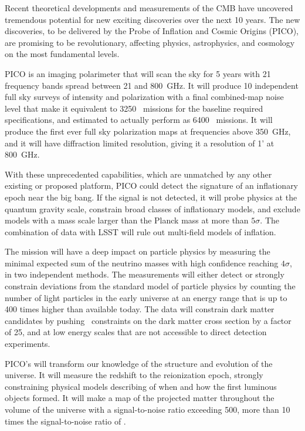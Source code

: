\documentclass[PICOReport.tex]{subfiles}
\begin{document}
Recent theoretical developments and measurements of the \ac{CMB} have uncovered tremendous potential for new exciting discoveries over the next 10 years. The new discoveries, to be delivered by the Probe of Inflation and Cosmic Origins (PICO), are promising to be revolutionary, affecting physics, astrophysics, and cosmology on the most fundamental levels. 

PICO is an imaging polarimeter that will scan the sky for 5 years with 21 frequency bands spread between 21 and 800~GHz. It will produce 10 independent full sky surveys of intensity and polarization with a final combined-map noise level that make it equivalent to 3250 \planck\ missions for the baseline required specifications, and estimated to actually perform as 6400 \planck\ missions. It will produce the first ever full sky polarization maps at frequencies above 350~GHz, and it will have diffraction limited resolution, giving it a resolution of 1' at 800~GHz. 

With these unprecedented capabilities, which are unmatched by any other existing or proposed platform, PICO could detect the signature of an inflationary epoch near the big bang. If the signal is not detected, it will probe physics at the quantum gravity scale, constrain broad classes of inflationary models, and exclude models with a mass scale larger than the Planck mass at more than $5\sigma$. The combination of data with LSST will rule out multi-field models of inflation. 

The mission will have a deep impact on particle physics by measuring the minimal expected sum of the neutrino masses with high confidence reaching $4\sigma$, in two independent methods. The measurements will either detect or strongly constrain deviations from the standard model of particle physics by counting the number of light particles in the early universe at an energy range that is up to 400 times higher than available today. The data will constrain dark matter candidates by pushing \planck\ constraints on the dark matter cross section by a factor of 25, and at low energy scales that are not accessible to direct detection experiments. 

PICO's will transform our knowledge of the structure and evolution of the universe. It will measure the redshift to the reionization epoch, strongly constraining physical models describing of when and how the first luminous objects formed. It will make a map of the projected matter throughout the volume of the universe with a signal-to-noise ratio exceeding 500, more than 10 times the signal-to-noise ratio of \planck. 
\end{document}
